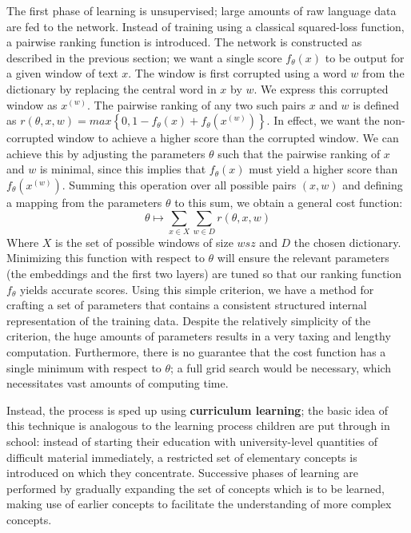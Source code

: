 The first phase of learning is unsupervised; large amounts of raw
language data are fed to the network. Instead of training using a
classical squared-loss function, a pairwise ranking function is
introduced. The network is constructed as described in the previous
section; we want a single score $f_{\theta}(x)$ to be output for a
given window of text $x$.  The window is first corrupted using a word
$w$ from the dictionary by replacing the central word in $x$ by
$w$. We express this corrupted window as $x^{(w)}$. The pairwise
ranking of any two such pairs $x$ and $w$ is defined as $r(\theta, x, w) = max\left\{0,
  1 - f_{\theta}(x) + f_{\theta}(x^{(w)})\right\}$. 
In effect, we want the non-corrupted window to achieve a higher score
than the corrupted window. We can achieve this by adjusting the
parameters $\theta$ such that the pairwise ranking of $x$ and $w$ is
minimal, since this implies that $f_{\theta}(x)$ must yield a higher
score than $f_{\theta}(x^{(w)})$. Summing this operation over all
possible pairs $(x, w)$ and defining a mapping from the parameters
$\theta$ to this sum, we obtain a general cost function:
\begin{equation}
  \theta \mapsto \sum\limits_{x \in X} \sum\limits_{w \in D} r(\theta, x, w)
\end{equation}
Where $X$ is the set of possible windows of size $wsz$ and $D$ the chosen
dictionary. Minimizing this function with respect to $\theta$ will
ensure the relevant parameters (the embeddings and the first two
layers) are tuned so that our ranking function $f_{\theta}$ yields
accurate scores. Using this simple criterion, we have a method for
crafting a set of parameters that contains a consistent structured
internal representation of the training data. Despite the relatively
simplicity of the criterion, the huge amounts of parameters results in
a very taxing and lengthy computation. Furthermore, there is no
guarantee that the cost function has a single minimum with respect to
$\theta$; a full grid search would be necessary, which necessitates
vast amounts of computing time. 

Instead, the process is sped up using \textbf{curriculum learning};
the basic idea of this technique is analogous to the learning process
children are put through in school: instead of starting their
education with university-level quantities of difficult material
immediately, a restricted set of elementary concepts is introduced on
which they concentrate. Successive phases of learning are performed by
gradually expanding the set of concepts which is to be learned, making
use of earlier concepts to facilitate the understanding of more
complex concepts.

